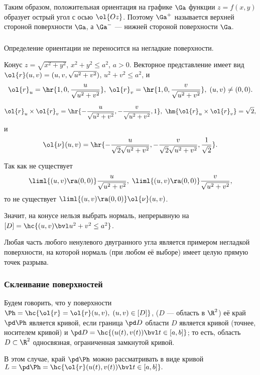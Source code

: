 \documentclass[a4paper]{article}
\begin{document}
Таким образом, положительная ориентация на графике $\Ga$ функции
$z=f(x,y)$ образует острый угол с осью $\ol{Oz}$. Поэтому $\Ga^+$
называется верхней стороной поверхности $\Ga$, а $\Ga^-$ --- нижней
стороной поверхности $\Ga$.

\subsubsection{}

Определение ориентации не переносится на негладкие поверхности.

\begin{ex}
Конус $z=\sqrt{x^2+y^2}$, $x^2+y^2\le a^2$, $a>0$. Векторное
представление имеет вид $\ol{r}(u,v)=(u,v,\sqrt{u^2+v^2})$,
$u^2+v^2\le a^2$, и $$\ol{r}_u=\hr{1,0,\frac{u}{\sqrt{u^2+v^2}}}, \;
\ol{r}_v=\hr{1,0,\frac{v}{\sqrt{u^2+v^2}}}, \; (u,v)\ne(0,0).$$

$$\ol{r}_u\times\ol{r}_v = \hr{-\frac{u}{\sqrt{u^2+v^2}}, -
\frac{v}{\sqrt{u^2+v^2}}, 1}, \;
\hm{\ol{r}_u\times\ol{r}_v}=\sqrt2,$$ и $$\ol{\nu}(u,v) =
\hr{-\frac{u}{\sqrt2 \sqrt{u^2+v^2}}, -
\frac{v}{\sqrt2\sqrt{u^2+v^2}}, \frac1{\sqrt2}}.$$

Так как не существует $$\liml{(u,v)\ra(0,0)}
\frac{u}{\sqrt{u^2+v^2}}, \; \liml{(u,v)\ra(0,0)}
\frac{v}{\sqrt{u^2+v^2}},$$ то не существует $\liml{(u,v)\ra(0,0)}
\ol{\nu}(u,v)$.

Значит, на конусе нельзя выбрать нормаль, непрерывную на $[D] =
\hc{(u,v)\bvl u^2+v^2\le a^2}$.
\end{ex}

\begin{ex}
Любая часть любого ненулевого двугранного угла является примером
негладкой поверхности, на которой нормаль (при любом её выборе)
имеет целую прямую точек разрыва.
\end{ex}

\subsubsection{Склеивание поверхностей}
Будем говорить, что у поверхности $\Ph=\hc{\ol{r}=\ol{r}(u,v), \;
(u,v)\in[D]}$, ($D$ --- область в $\R^2$) её край $\pd \Ph$ является
кривой, если граница $\pd D$ области $D$ является кривой (точнее,
носителем кривой) и $\pd D = \hc{(u(t),v(t)) \bvl t\in[a,b]}$; то
есть, область $D\subset\R^2$ односвязная, ограниченная замкнутой
кривой.

В этом случае, край $\pd \Ph$ можно рассматривать в виде кривой
$L=\pd\Ph=\hc{\ol{r}(u(t),v(t))\bvl t\in[a,b]}.$
\end{document}
